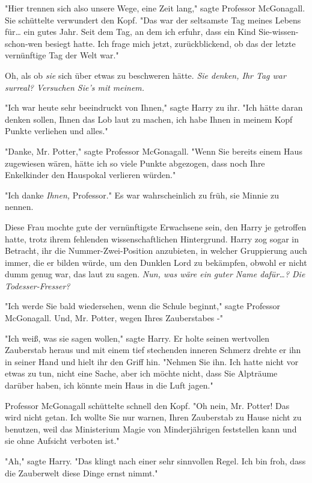 {"Hier trennen sich also unsere Wege, eine Zeit lang," sagte Professor McGonagall. Sie schüttelte verwundert den Kopf. "Das war der seltsamste Tag meines Lebens für… ein gutes Jahr. Seit dem Tag, an dem ich erfuhr, dass ein Kind Sie-wissen-schon-wen besiegt hatte. Ich frage mich jetzt, zurückblickend, ob das der letzte vernünftige Tag der Welt war."

Oh, als ob \emph{sie} sich über etwas zu beschweren hätte. \emph{Sie denken, Ihr Tag war surreal? Versuchen Sie's mit meinem.}

"Ich war heute sehr beeindruckt von Ihnen," sagte Harry zu ihr. "Ich hätte daran denken sollen, Ihnen das Lob laut zu machen, ich habe Ihnen in meinem Kopf Punkte verliehen und alles."

"Danke, Mr. Potter," sagte Professor McGonagall. "Wenn Sie bereits einem Haus zugewiesen wären, hätte ich so viele Punkte abgezogen, dass noch Ihre Enkelkinder den Hauspokal verlieren würden."

"Ich danke \emph{Ihnen,} Professor." Es war wahrscheinlich zu früh, sie Minnie zu nennen.

Diese Frau mochte gute der vernünftigste Erwachsene sein, den Harry je getroffen hatte, trotz ihrem fehlenden wissenschaftlichen Hintergrund. Harry zog sogar in Betracht, ihr die Nummer-Zwei-Position anzubieten, in welcher Gruppierung auch immer, die er bilden würde, um den Dunklen Lord zu bekämpfen, obwohl er nicht dumm genug war, das laut zu sagen. \emph{Nun, was wäre ein guter Name dafür…? Die Todesser-Fresser?}

"Ich werde Sie bald wiedersehen, wenn die Schule beginnt," sagte Professor McGonagall. Und, Mr. Potter, wegen Ihres Zauberstabes -"

"Ich weiß, was sie sagen wollen," sagte Harry. Er holte seinen wertvollen Zauberstab heraus und mit einem tief stechenden inneren Schmerz drehte er ihn in seiner Hand und hielt ihr den Griff hin. "Nehmen Sie ihn. Ich hatte nicht vor etwas zu tun, nicht eine Sache, aber ich möchte nicht, dass Sie Alpträume darüber haben, ich könnte mein Haus in die Luft jagen."

Professor McGonagall schüttelte schnell den Kopf. "Oh nein, Mr. Potter! Das wird nicht getan. Ich wollte Sie nur warnen, Ihren Zauberstab zu Hause nicht zu benutzen, weil das Ministerium Magie von Minderjährigen feststellen kann und sie ohne Aufsicht verboten ist."

"Ah," sagte Harry. "Das klingt nach einer sehr sinnvollen Regel. Ich bin froh, dass die Zauberwelt diese Dinge ernst nimmt."

}
